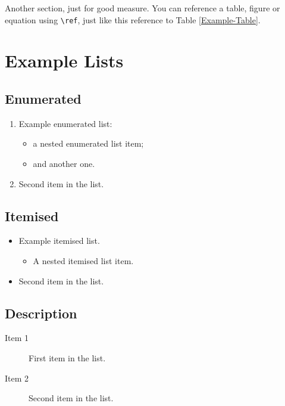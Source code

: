 \documentclass[12pt,a4paper]{report}
\theoremstyle{definition}
\begin{document}
Another section, just for good measure. You can reference a table, figure or equation using \verb|\ref|, just like this reference to Table \ref{Example-Table}.

\section{Example Lists}

\subsection{Enumerated}

\begin{enumerate}
\item Example enumerated list:
  \begin{itemize}
  \item a nested enumerated list item;
  \item and another one.
  \end{itemize}
\item Second item in the list.
\end{enumerate}

\subsection{Itemised}

\begin{itemize}
\item Example itemised list.
  \begin{itemize}
  \item A nested itemised list item.
  \end{itemize}
\item Second item in the list.
\end{itemize}

\subsection{Description}

\begin{description}
\item[Item 1]First item in the list.
\item[Item 2]Second item in the list.
\end{description}
\end{document}
